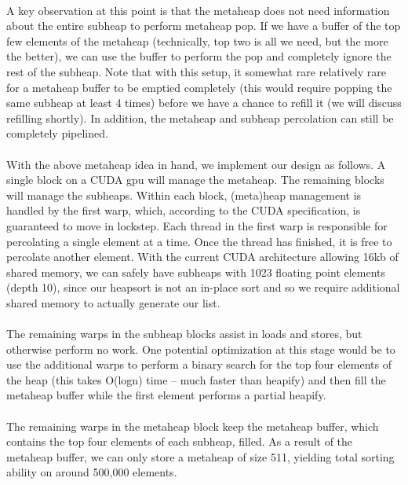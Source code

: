 \documentclass{article}
\begin{document}
\begin{enumerate}
\\
A key observation at this point is that the metaheap does not need information about the entire subheap to perform metaheap pop.  If we have a buffer of the top few elements of the metaheap (technically, top two is all we need, but the more the better), we can use the buffer to perform the pop and completely ignore the rest of the subheap.  Note that with this setup, it somewhat rare relatively rare for a metaheap buffer to be emptied completely (this would require popping the same subheap at least 4 times) before we have a chance to refill it (we will discuss refilling shortly).  In addition, the metaheap and subheap percolation can still be completely pipelined.\\
\\
With the above metaheap idea in hand, we implement our design as follows.  A single block on a CUDA gpu will manage the metaheap.  The remaining blocks will manage the subheaps.  Within each block, (meta)heap management is handled by the first warp, which, according to the CUDA specification, is guaranteed to move in lockstep.  Each thread in the first warp is responsible for percolating a single element at a time.  Once the thread has finished, it is free to percolate another element.  With the current CUDA architecture allowing 16kb of shared memory, we can safely have subheaps with 1023 floating point elements (depth 10), since our heapsort is not an in-place sort and so we require additional shared memory to actually generate our list.\\
\\
The remaining warps in the subheap blocks assist in loads and stores, but otherwise perform no work.  One potential optimization at this stage would be to use the additional warps to perform a binary search for the top four elements of the heap (this takes O(logn) time -- much faster than heapify) and then fill the metaheap buffer while the first element performs a partial heapify.\\
\\
The remaining warps in the metaheap block keep the metaheap buffer, which contains the top four elements of each subheap, filled.  As a result of the metaheap buffer, we can only store a metaheap of size 511, yielding total sorting ability on around 500,000 elements.\\


\end{enumerate}
\end{document}
